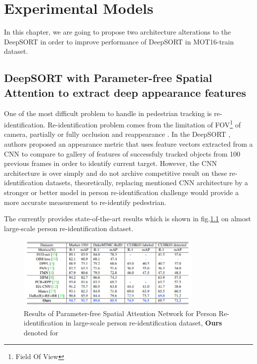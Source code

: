 \chapter{Experimental Models}
\hspace{0.5cm} In this chapter, we are going to propose two architecture alterations to the DeepSORT\cite{Wojke2017simple} in order to
improve performance of DeepSORT\cite{Wojke2017simple} in MOT16-train dataset\cite{Milan2016MOT16AB}.
\section{DeepSORT with Parameter-free Spatial Attention to extract deep appearance features}
\hspace{0.5cm} One of the most difficult problem to handle in pedestrian tracking is re-identification. Re-identification problem comes from the limitation of
FOV\footnote{Field Of View} of camera, partially or fully occlusion and
reappearance . In the DeepSORT \cite{Wojke2017simple}, authors proposed an
appearance metric that uses feature vectors extracted from a CNN to compare to
gallery of features of successfuly tracked objects from 100 previous
frames in order to identify current target. However, the CNN architecture is
over simply and do not archive competitive result on these
re-identification datasets, theoretically, replacing mentioned CNN
architecture by a stronger or better model in person re-identification
challenge would provide a more accurate measurement to re-identify pedestrian.\par
The \cite{SA} currently provides state-of-the-art results which is shown in fig.\ref{fig:sa_results} on almost large-scale person
re-identification dataset.\par
\begin{figure}[h!]
    \centering
    \includegraphics[width=0.8\textwidth]{Chapters/Fig/person-re-id-performance.png}
    \caption{Results of Parameter-free Spatial Attention Network for Person Re-identification in large-scale person re-identification dataset,
    \textbf{Ours} denoted for \cite{SA}}
    \label{fig:sa_results}
\end{figure}
